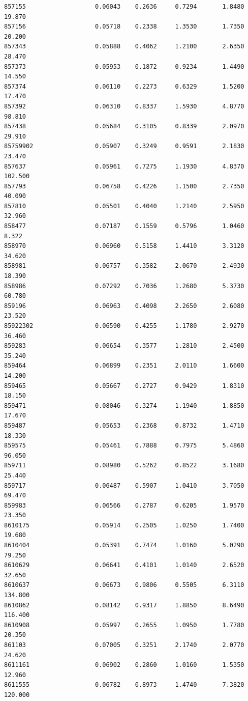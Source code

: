 \documentclass[
  letterpaper,
  DIV=11,
  numbers=noendperiod]{scrartcl}
\begin{document}
\begin{verbatim}
857155                   0.06043    0.2636     0.7294       1.8480  19.870
857156                   0.05718    0.2338     1.3530       1.7350  20.200
857343                   0.05888    0.4062     1.2100       2.6350  28.470
857373                   0.05953    0.1872     0.9234       1.4490  14.550
857374                   0.06110    0.2273     0.6329       1.5200  17.470
857392                   0.06310    0.8337     1.5930       4.8770  98.810
857438                   0.05684    0.3105     0.8339       2.0970  29.910
85759902                 0.05907    0.3249     0.9591       2.1830  23.470
857637                   0.05961    0.7275     1.1930       4.8370 102.500
857793                   0.06758    0.4226     1.1500       2.7350  40.090
857810                   0.05501    0.4040     1.2140       2.5950  32.960
858477                   0.07187    0.1559     0.5796       1.0460   8.322
858970                   0.06960    0.5158     1.4410       3.3120  34.620
858981                   0.06757    0.3582     2.0670       2.4930  18.390
858986                   0.07292    0.7036     1.2680       5.3730  60.780
859196                   0.06963    0.4098     2.2650       2.6080  23.520
85922302                 0.06590    0.4255     1.1780       2.9270  36.460
859283                   0.06654    0.3577     1.2810       2.4500  35.240
859464                   0.06899    0.2351     2.0110       1.6600  14.200
859465                   0.05667    0.2727     0.9429       1.8310  18.150
859471                   0.08046    0.3274     1.1940       1.8850  17.670
859487                   0.05653    0.2368     0.8732       1.4710  18.330
859575                   0.05461    0.7888     0.7975       5.4860  96.050
859711                   0.08980    0.5262     0.8522       3.1680  25.440
859717                   0.06487    0.5907     1.0410       3.7050  69.470
859983                   0.06566    0.2787     0.6205       1.9570  23.350
8610175                  0.05914    0.2505     1.0250       1.7400  19.680
8610404                  0.05391    0.7474     1.0160       5.0290  79.250
8610629                  0.06641    0.4101     1.0140       2.6520  32.650
8610637                  0.06673    0.9806     0.5505       6.3110 134.800
8610862                  0.08142    0.9317     1.8850       8.6490 116.400
8610908                  0.05997    0.2655     1.0950       1.7780  20.350
861103                   0.07005    0.3251     2.1740       2.0770  24.620
8611161                  0.06902    0.2860     1.0160       1.5350  12.960
8611555                  0.06782    0.8973     1.4740       7.3820 120.000

\end{verbatim}
\end{document}
